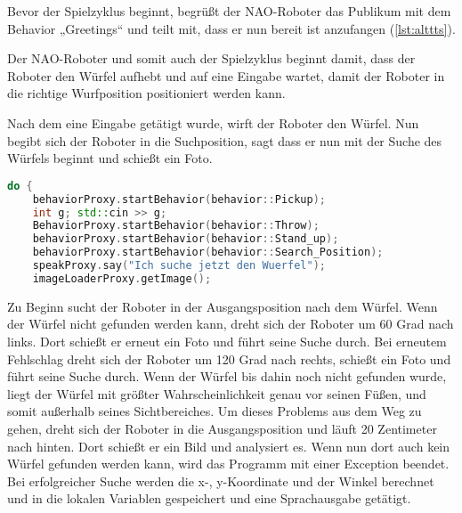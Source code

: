         Bevor der Spielzyklus beginnt, begrüßt der NAO-Roboter das Publikum mit
        dem Behavior „Greetings“ und teilt mit, dass er nun bereit ist
        anzufangen (\autoref{lst:alttts}).

        Der NAO-Roboter und somit auch der Spielzyklus beginnt damit, dass der
        Roboter den Würfel aufhebt und auf eine Eingabe wartet, damit der
        Roboter in die richtige Wurfposition positioniert werden kann.

        Nach dem eine Eingabe getätigt wurde, wirft der Roboter den Würfel.
        Nun begibt sich der Roboter in die Suchposition, sagt dass
        er nun mit der Suche des Würfels beginnt und schießt ein Foto.

\begin{lstlisting}[language=c++,
                   caption={Mainloop, Teil 1},
                   label={lst:main1}]
do {
    behaviorProxy.startBehavior(behavior::Pickup);
    int g; std::cin >> g;
    BehaviorProxy.startBehavior(behavior::Throw);
    behaviorProxy.startBehavior(behavior::Stand_up);
    behaviorProxy.startBehavior(behavior::Search_Position);
    speakProxy.say("Ich suche jetzt den Wuerfel");
    imageLoaderProxy.getImage();
\end{lstlisting}

        Zu Beginn sucht der Roboter in der Ausgangsposition nach dem Würfel.
        Wenn der Würfel nicht gefunden werden kann, dreht sich der Roboter um
        60 Grad nach links.
        Dort schießt er erneut ein Foto und führt seine Suche durch.
        Bei erneutem Fehlschlag dreht sich der Roboter um 120 Grad nach rechts,
        schießt ein Foto und führt seine Suche durch.
        Wenn der Würfel bis dahin noch nicht gefunden wurde, liegt der Würfel
        mit größter Wahrscheinlichkeit genau vor seinen Füßen, und somit
        außerhalb seines Sichtbereiches.
        Um dieses Problems aus dem Weg zu gehen, dreht sich der Roboter in die
        Ausgangsposition und läuft 20 Zentimeter nach hinten.
        Dort schießt er ein Bild und analysiert es.
        Wenn nun dort auch kein Würfel gefunden werden kann, wird das Programm
        mit einer Exception beendet.
        Bei erfolgreicher Suche werden die x-, y-Koordinate und der Winkel
        berechnet und in die lokalen Variablen gespeichert und eine
        Sprachausgabe getätigt.

